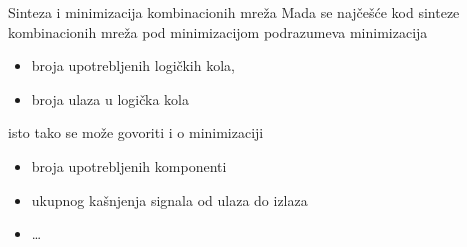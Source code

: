 \begin{frame}[label=02-s007]{Sinteza i minimizacija kombinacionih mreža}
Mada se najčešće kod sinteze kombinacionih mreža pod \alert{minimizacijom} podrazumeva minimizacija
\begin{itemize}
\item broja upotrebljenih logičkih kola,
\item broja ulaza u logička kola
\end{itemize}
\vspace{4mm}
isto tako se može govoriti i o minimizaciji
\begin{itemize}
\item broja upotrebljenih \alert{komponenti}
\item ukupnog kašnjenja signala od ulaza do izlaza
\item \ldots
\end{itemize}
\end{frame}
